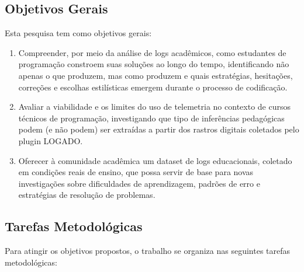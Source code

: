\subsection{Objetivos Gerais}
\label{subsec:objetivos-gerais}

Esta pesquisa tem como objetivos gerais:

\begin{enumerate}
    \item Compreender, por meio da análise de logs acadêmicos, como estudantes de programação constroem suas soluções ao longo do tempo, identificando não apenas o que produzem, mas como produzem e quais estratégias, hesitações, correções e escolhas estilísticas emergem durante o processo de codificação.
    
    \item Avaliar a viabilidade e os limites do uso de telemetria no contexto de cursos técnicos de programação, investigando que tipo de inferências pedagógicas podem (e não podem) ser extraídas a partir dos rastros digitais coletados pelo plugin LOGADO.
    
    \item Oferecer à comunidade acadêmica um dataset de logs educacionais, coletado em condições reais de ensino, que possa servir de base para novas investigações sobre dificuldades de aprendizagem, padrões de erro e estratégias de resolução de problemas.
\end{enumerate}

\subsection{Tarefas Metodológicas}
\label{subsec:tarefas-metodologicas}

Para atingir os objetivos propostos, o trabalho se organiza nas seguintes tarefas metodológicas:

